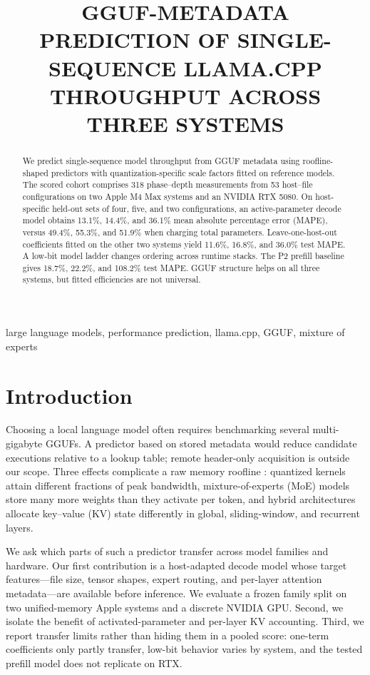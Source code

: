 \documentclass{article}
\title{GGUF-METADATA PREDICTION OF SINGLE-SEQUENCE LLAMA.CPP THROUGHPUT ACROSS THREE SYSTEMS}
\begin{document}
\ninept
\setlength{\emergencystretch}{1em}
\maketitle

\begin{abstract}
We predict single-sequence model throughput from GGUF metadata using
roofline-shaped predictors with quantization-specific scale factors fitted on
reference models.  The scored cohort comprises 318 phase--depth measurements
from 53 host--file configurations on two Apple M4 Max systems and an NVIDIA RTX
5080.  On host-specific held-out sets of four, five, and two configurations, an
active-parameter decode model obtains 13.1\%, 14.4\%, and 36.1\% mean absolute
percentage error (MAPE), versus 49.4\%, 55.3\%, and 51.9\% when charging total
parameters.  Leave-one-host-out coefficients fitted on the other two systems
yield 11.6\%, 16.8\%, and 36.0\% test MAPE.  A low-bit model ladder changes
ordering across runtime stacks.  The P2 prefill baseline gives 18.7\%, 22.2\%,
and 108.2\% test MAPE.  GGUF structure helps on all three systems, but fitted
efficiencies are not universal.
\end{abstract}

\begin{keywords}
large language models, performance prediction, llama.cpp, GGUF,
mixture of experts
\end{keywords}

\section{Introduction}
\label{sec:intro}

Choosing a local language model often requires benchmarking several
multi-gigabyte GGUFs.  A predictor based on stored metadata would reduce
candidate executions relative to a lookup table; remote header-only acquisition
is outside our scope.  Three effects complicate a raw memory roofline
\cite{williams2009roofline}: quantized kernels attain different fractions
of peak bandwidth, mixture-of-experts (MoE) models store many more weights than
they activate per token, and hybrid architectures allocate key--value (KV) state differently
in global, sliding-window, and recurrent layers.

We ask which parts of such a predictor transfer across model families and
hardware.  Our first contribution is a host-adapted decode model whose target
features---file size, tensor shapes, expert routing, and per-layer attention
metadata---are available before inference.  We evaluate a frozen family split
on two unified-memory Apple systems and a discrete NVIDIA GPU.  Second, we
isolate the benefit of activated-parameter and per-layer KV accounting.  Third,
we report transfer limits rather than hiding them in a pooled score: one-term
coefficients only partly transfer, low-bit behavior varies by system, and
the tested prefill model does not replicate on RTX.
\end{document}
